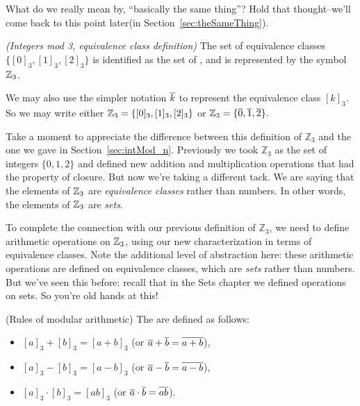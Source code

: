 \begin{rem}
What do we really mean by, ``basically the same thing''? Hold that thought--we'll come back to this point later(in Section~\ref{sec:theSameThing}).
 \end{rem}

\begin{defn}\label{mod_eqiv_def_3} \emph{(Integers mod 3, equivalence class definition)}
The set of equivalence classes $\{ [0]_3, [1]_3, [2]_3 \}$ is identified as the set of , and is represented by the symbol~$\mathbb{Z}_3$.

We may also use the simpler notation $\overline{k}$ to represent the equivalence class  $[k]_3$. So we may write either  
$\mathbb{Z}_3 = \{ [0]_3, [1]_3, [2]_3 \}$ or $\mathbb{Z}_3 = \{ \overline{0}, \overline{1}, \overline{2} \} .$
\end{defn}

Take a moment to appreciate the difference between this definition of $\mathbb{Z}_3$  and the one we gave in Section~\ref{sec:intMod_n}. Previously we took $\mathbb{Z}_3$ as the set of integers $\{0,1,2\}$ and defined new addition and multiplication operations that had the property of closure. But now we're taking a different tack. We are saying that the elements of $\mathbb{Z}_3$ are \emph{equivalence classes} rather than numbers. In other words, the elements of $\mathbb{Z}_3$ are \emph{sets}.

To complete the connection with our previous definition of  $\mathbb{Z}_3$, we need to define arithmetic operations on $\mathbb{Z}_3$, using our new characterization in terms of equivalence classes. Note the additional level of abstraction here: these arithmetic operations are defined on equivalence classes, which are \emph{sets} rather than numbers. But we've seen this before: recall that in the Sets chapter we defined operations on sets. So you're old hands at this!

\begin{defn}\label{RulesOfModArith} (Rules of modular arithmetic)
The  are defined as follows:
\begin{itemize}
\item $[a]_3 + [b]_3 = [a+b]_3$ \qquad (or $\overline{a} + \overline{b} = \overline{a + b}$),
\item $[a]_3 - [b]_3 = [a-b]_3$ \qquad (or $\overline{a} - \overline{b} = \overline{a - b}$),
\item $[a]_3 \cdot [b]_3 = [ab]_3$ \qquad (or $\overline{a} \cdot \overline{b} = \overline{a  b}$).
\end{itemize}
\end{defn}

